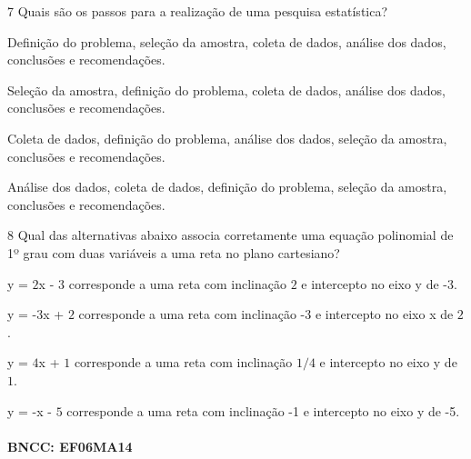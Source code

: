 \num{7}  Quais são os passos para a realização de uma pesquisa estatística?

\begin{escolha}
\item Definição do problema, seleção da amostra, coleta de dados, análise
dos dados, conclusões e recomendações.
\item Seleção da amostra, definição do problema, coleta de dados, análise
dos dados, conclusões e recomendações.
\item Coleta de dados, definição do problema, análise dos dados, seleção da
amostra, conclusões e recomendações.
\item Análise dos dados, coleta de dados, definição do problema, seleção da
amostra, conclusões e recomendações.
\end{escolha}



\num{8}  Qual das alternativas abaixo associa corretamente uma equação
polinomial de 1º grau com duas variáveis a uma reta no plano cartesiano?

\begin{escolha}
\item y = $2$x - $3$ corresponde a uma reta com inclinação $2$ e intercepto no
eixo y de -3.
\item y = -3x + $2$ corresponde a uma reta com inclinação -3 e intercepto no
eixo x de $2$.
\item y = $4$x + $1$ corresponde a uma reta com inclinação $1/4$ e intercepto no
eixo y de $1$.
\item y = -x - $5$ corresponde a uma reta com inclinação -1 e intercepto no
eixo y de -5.
\end{escolha}

\paragraph{BNCC: EF06MA14}

